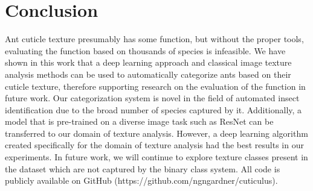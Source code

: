 \documentclass{aci}
\numberwithin{equation}{section}
\begin{document}
\section{Conclusion}
Ant cuticle texture presumably has some function, but without the proper tools,
evaluating the function based on thousands of species is infeasible. We have
shown in this work that a deep learning approach and classical image texture
analysis methods can be used to automatically categorize ants based on their
cuticle texture, therefore supporting research on the evaluation of the function
in future work. Our categorization system is novel in the field of automated
insect identification due to the broad number of species captured by it.
Additionally, a model that is pre-trained on a diverse image task such as ResNet
can be transferred to our domain of texture analysis. However, a deep learning
algorithm created specifically for the domain of texture analysis had the best
results in our experiments. In future work, we will continue to explore texture
classes present in the dataset which are not captured by the binary class
system. All code is publicly available on GitHub
(https://github.com/ngngardner/cuticulus).



\end{document}
